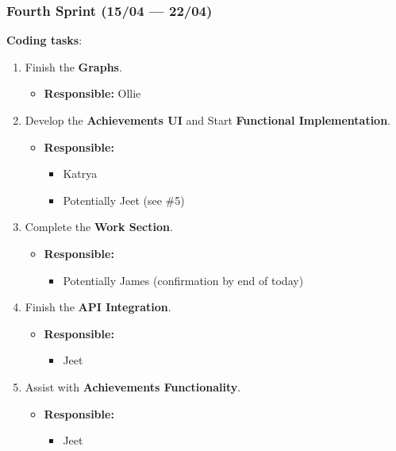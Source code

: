 \documentclass[11pt]{article}
\begin{document}
\hypertarget{fourth-sprint-1504-2204}{%
\subsubsection{Fourth Sprint (15/04 ---
22/04)}\label{fourth-sprint-1504-2204}}

\textbf{Coding tasks}:

\begin{enumerate}
\def\labelenumi{\arabic{enumi}.}
\tightlist
\item
  Finish the \textbf{Graphs}.

  \begin{itemize}
  \tightlist
  \item
    \textbf{Responsible:} Ollie
  \end{itemize}
\item
  Develop the \textbf{Achievements UI} and Start \textbf{Functional
  Implementation}.

  \begin{itemize}
  \tightlist
  \item
    \textbf{Responsible:}

    \begin{itemize}
    \tightlist
    \item
      Katrya
    \item
      Potentially Jeet (see \#5)
    \end{itemize}
  \end{itemize}
\item
  Complete the \textbf{Work Section}.

  \begin{itemize}
  \tightlist
  \item
    \textbf{Responsible:}

    \begin{itemize}
    \tightlist
    \item
      Potentially James (confirmation by end of today)
    \end{itemize}
  \end{itemize}
\item
  Finish the \textbf{API Integration}.

  \begin{itemize}
  \tightlist
  \item
    \textbf{Responsible:}

    \begin{itemize}
    \tightlist
    \item
      Jeet
    \end{itemize}
  \end{itemize}
  \newpage
\item
  Assist with \textbf{Achievements Functionality}.

  \begin{itemize}
  \tightlist
  \item
    \textbf{Responsible:}

    \begin{itemize}
    \tightlist
    \item
      Jeet
    \end{itemize}
  \end{itemize}
\end{enumerate}
\end{document}
